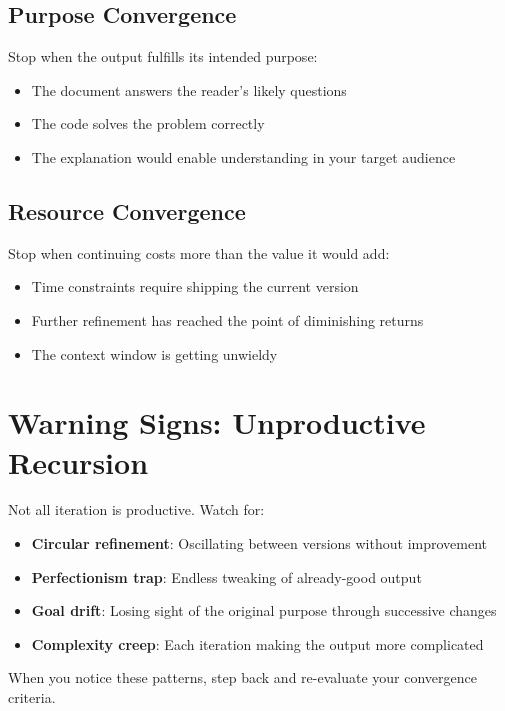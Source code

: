 \subsection{Purpose Convergence}

Stop when the output fulfills its intended purpose:

\begin{itemize}
    \item The document answers the reader's likely questions
    \item The code solves the problem correctly
    \item The explanation would enable understanding in your target audience
\end{itemize}

\subsection{Resource Convergence}

Stop when continuing costs more than the value it would add:

\begin{itemize}
    \item Time constraints require shipping the current version
    \item Further refinement has reached the point of diminishing returns
    \item The context window is getting unwieldy
\end{itemize}

\section{Warning Signs: Unproductive Recursion}

Not all iteration is productive. Watch for:

\begin{itemize}
    \item \textbf{Circular refinement}: Oscillating between versions without improvement
    \item \textbf{Perfectionism trap}: Endless tweaking of already-good output
    \item \textbf{Goal drift}: Losing sight of the original purpose through successive changes
    \item \textbf{Complexity creep}: Each iteration making the output more complicated
\end{itemize}

When you notice these patterns, step back and re-evaluate your convergence criteria.

